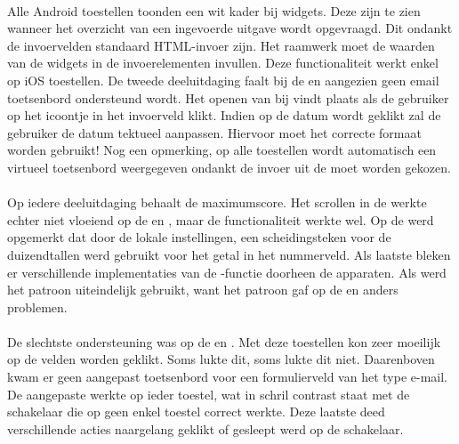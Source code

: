 \paragraph{\kendo} 
Alle Android toestellen toonden een wit kader bij  widgets.
Deze zijn te zien wanneer het overzicht van een ingevoerde uitgave wordt opgevraagd.
Dit ondankt de invoervelden standaard HTML-invoer zijn.
Het raamwerk moet de waarden van de widgets in de  invoerelementen invullen.
Deze functionaliteit werkt enkel op iOS toestellen.
De tweede deeluitdaging faalt bij de \htc{} en \gtab{} aangezien geen email toetsenbord ondersteund wordt.
Het openen van  bij \kendo{} vindt plaats als de gebruiker op het icoontje in het invoerveld klikt.
Indien op de datum wordt geklikt zal de gebruiker de datum tektueel aanpassen.  
Hiervoor moet het correcte formaat worden gebruikt!
Nog een opmerking,  op alle toestellen wordt automatisch een virtueel toetsenbord weergegeven ondankt de invoer uit de  moet worden gekozen.

\paragraph{\jqm} 
Op iedere deeluitdaging behaalt \jqm{} de maximumscore.
Het scrollen in de  werkte echter niet vloeiend op de \htc{} en \gtab{}, maar de functionaliteit werkte wel.
Op de \ipadi{} werd opgemerkt dat door de lokale instellingen, een scheidingsteken voor de duizendtallen werd gebruikt voor het getal in het nummerveld.
Als laatste bleken er verschillende implementaties van de \js{}-functie  doorheen de apparaten.
Als  werd het patroon  uiteindelijk gebruikt, want het patroon  gaf op de \htc{} en \gtab{} anders problemen.

\paragraph{\lungo} 
De slechtste ondersteuning was op de \htc{} en \gtab{}.
Met deze toestellen kon zeer moeilijk op de velden worden geklikt.
Soms lukte dit, soms lukte dit niet.
Daarenboven kwam er geen aangepast toetsenbord voor een formulierveld van het type e-mail.
De aangepaste  werkte op ieder toestel, wat in schril contrast staat met de schakelaar die op geen enkel toestel correct werkte.
Deze laatste deed verschillende acties naargelang geklikt of gesleept werd op de schakelaar.

